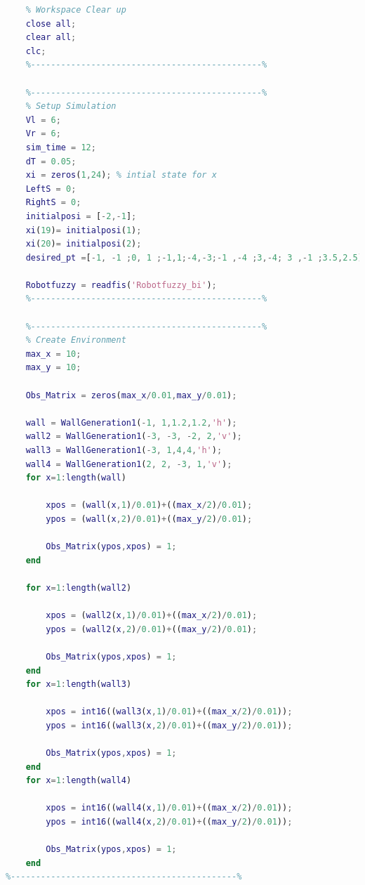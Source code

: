 \documentclass{l4proj}
\begin{document}
\begin{lstlisting}[language=Matlab, float, caption={Task 2 ,With additional waypoints (Test 2)}, label=lst:callahan] 
     %----------------------------------------------%
    % Workspace Clear up
    close all;
    clear all;
    clc;
    %----------------------------------------------%
    
    %----------------------------------------------%
    % Setup Simulation
    Vl = 6;
    Vr = 6;
    sim_time = 12;
    dT = 0.05;
    xi = zeros(1,24); % intial state for x
    LeftS = 0;
    RightS = 0;
    initialposi = [-2,-1];
    xi(19)= initialposi(1);
    xi(20)= initialposi(2);
    desired_pt =[-1, -1 ;0, 1 ;-1,1;-4,-3;-1 ,-4 ;3,-4; 3 ,-1 ;3.5,2.5];
    
    Robotfuzzy = readfis('Robotfuzzy_bi');
    %----------------------------------------------%
    
    %----------------------------------------------%
    % Create Environment
    max_x = 10;
    max_y = 10;
    
    Obs_Matrix = zeros(max_x/0.01,max_y/0.01);
    
    wall = WallGeneration1(-1, 1,1.2,1.2,'h');
    wall2 = WallGeneration1(-3, -3, -2, 2,'v');
    wall3 = WallGeneration1(-3, 1,4,4,'h');
    wall4 = WallGeneration1(2, 2, -3, 1,'v');
    for x=1:length(wall)
        
        xpos = (wall(x,1)/0.01)+((max_x/2)/0.01);
        ypos = (wall(x,2)/0.01)+((max_y/2)/0.01);
        
        Obs_Matrix(ypos,xpos) = 1;
    end
    
    for x=1:length(wall2)
        
        xpos = (wall2(x,1)/0.01)+((max_x/2)/0.01);
        ypos = (wall2(x,2)/0.01)+((max_y/2)/0.01);
        
        Obs_Matrix(ypos,xpos) = 1;
    end
    for x=1:length(wall3)
        
        xpos = int16((wall3(x,1)/0.01)+((max_x/2)/0.01));
        ypos = int16((wall3(x,2)/0.01)+((max_y/2)/0.01));
        
        Obs_Matrix(ypos,xpos) = 1;
    end
    for x=1:length(wall4)
        
        xpos = int16((wall4(x,1)/0.01)+((max_x/2)/0.01));
        ypos = int16((wall4(x,2)/0.01)+((max_y/2)/0.01));
        
        Obs_Matrix(ypos,xpos) = 1;
    end
%---------------------------------------------%
\end{lstlisting}
\end{document}
